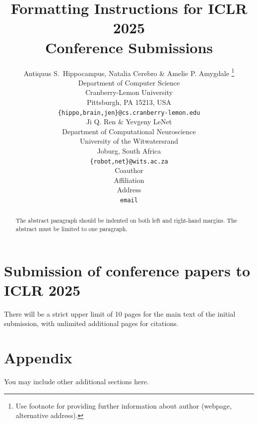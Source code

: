 \documentclass{article} %
\title{Formatting Instructions for ICLR 2025 \\ Conference Submissions}
\author{Antiquus S.~Hippocampus, Natalia Cerebro \& Amelie P. Amygdale \thanks{ Use footnote for providing further information
about author (webpage, alternative address).} \\
Department of Computer Science\\
Cranberry-Lemon University\\
Pittsburgh, PA 15213, USA \\
\texttt{\{hippo,brain,jen\}@cs.cranberry-lemon.edu} \\
\And
Ji Q. Ren \& Yevgeny LeNet \\
Department of Computational Neuroscience \\
University of the Witwatersrand \\
Joburg, South Africa \\
\texttt{\{robot,net\}@wits.ac.za} \\
\AND
Coauthor \\
Affiliation \\
Address \\
\texttt{email}
}
\begin{document}
\maketitle

\begin{abstract}
The abstract paragraph should be indented on both left and right-hand margins.
The abstract must be limited to one paragraph.
\end{abstract}

\section{Submission of conference papers to ICLR 2025}

There will be a strict upper limit of 10 pages for the main text of the
initial submission, with unlimited additional pages for citations.




\appendix
\section{Appendix}
You may include other additional sections here.
\end{document}
